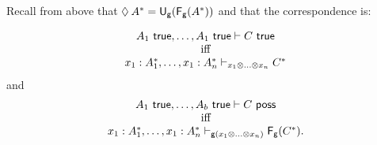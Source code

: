 Recall from above that $\Diamond_{} \, {A}^* =
\mathsf{U}_{\mathsf{g}}(\mathsf{F}_{\mathsf{g}}(A^*))$ and that the correspondence is:
\begin{theorem}
\[
\begin{array}{c}
A_1 \,\, \mathsf{true}, \ldots, A_1 \,\, \mathsf{true} \vdash C \,\, \mathsf{true}\\
\text{iff}\\
x_1:A_1^*,\ldots,x_1:A_n^* \vdash_{x_1\otimes\ldots\otimes x_n} C^*
\end{array}
\]
and 
\[
\begin{array}{c}
A_1 \,\, \mathsf{true}, \ldots, A_b \,\, \mathsf{true} \vdash C \,\, \mathsf{poss}\\
\text{iff}\\
x_1:A_1^*,\ldots,x_1:A_n^* \vdash_{\mathsf{g}(x_1\otimes\ldots\otimes x_n)} \mathsf{F}_{\mathsf{g}}(C^*).
\end{array}
\]
\end{theorem}

